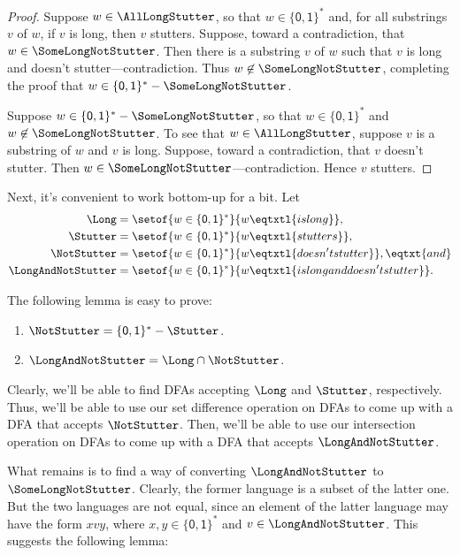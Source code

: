 \begin{proof}
Suppose $w\in\AllLongStutter$, so that
$w\in\{\mathsf{0,1}\}^*$ and, for all substrings $v$ of $w$,
if $v$ is long, then $v$ stutters.  Suppose, toward a contradiction,
that $w\in\SomeLongNotStutter$.  Then there is a substring $v$ of
$w$ such that $v$ is long and doesn't stutter---contradiction.
Thus $w\not\in\SomeLongNotStutter$, completing the proof
that $w\in \{\mathsf{0,1}\}^*-\SomeLongNotStutter$.

Suppose $w\in\{\mathsf{0,1}\}^*-\SomeLongNotStutter$, so that
$w\in\{\mathsf{0,1}\}^*$ and $w\not\in
\SomeLongNotStutter$.  To see that $w\in\AllLongStutter$,
suppose $v$ is a substring of $w$ and $v$ is long.  Suppose, toward a
contradiction, that $v$ doesn't stutter.  Then
$w\in\SomeLongNotStutter$---contradiction.  Hence $v$ stutters.
\end{proof}

Next, it's convenient to work bottom-up for a bit.  Let
\begin{align*}
\Long &= \setof{w\in\{\mathsf{0,1}\}^*}{w\eqtxtl{is long}} , \\
\Stutter &= \setof{w\in\{\mathsf{0,1}\}^*}{w\eqtxtl{stutters}} , \\
\NotStutter &= \setof{w\in\{\mathsf{0,1}\}^*}{w\eqtxtl{doesn't stutter}} ,
  \eqtxt{and} \\
\LongAndNotStutter &=
\setof{w\in\{\mathsf{0,1}\}^*}{w\eqtxtl{is long and doesn't stutter}} .
\end{align*}

The following lemma is easy to prove:

\begin{lemma}
\label{Stutter2}
\begin{enumerate}[\quad(1)]
\item $\NotStutter = \{\mathsf{0,1}\}^* - \Stutter$.

\item $\LongAndNotStutter = \Long\cap\NotStutter$.
\end{enumerate}
\end{lemma}

Clearly, we'll be able to find DFAs accepting $\Long$ and $\Stutter$,
respectively.  Thus, we'll be able to use our set difference operation
on DFAs to come up with a DFA that accepts $\NotStutter$.  Then,
we'll be able to use our intersection operation on DFAs to come
up with a DFA that accepts $\LongAndNotStutter$.

What remains is to find a way of converting $\LongAndNotStutter$
to $\SomeLongNotStutter$.  Clearly, the former language is
a subset of the latter one.  But the two languages are not equal,
since an element of the latter language may have the form
$xvy$, where $x,y\in\{\mathsf{0,1}\}^*$ and $v\in\LongAndNotStutter$.
This suggests the following lemma:

